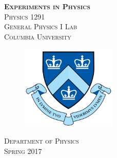 \begin{titlepage}
\begin{center}
\textsc{\Huge\bf Experiments in Physics}
\\[5cm]
\textsc{\huge Physics 1291}
\\[0.3cm]
\textsc{\huge General Physics I Lab}
\\[4cm]
\textsc{\large Columbia University}
\\[0.5cm]
\begin{figure}[h]
  \centering
  \includegraphics[height=4cm]{./pic/Columbia-Logo.png}
\end{figure}
\textsc{Department of Physics}
\\[1cm]
\textsc{Spring 2017}
\end{center}
\end{titlepage}
